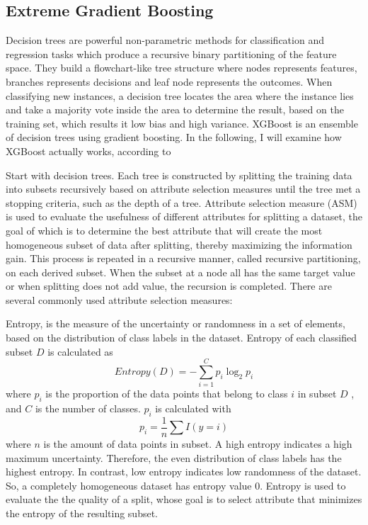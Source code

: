 \documentclass[12pt,a4paper,english
]{tunithesis}
\begin{document}
\subsection{Extreme Gradient Boosting}
Decision trees are powerful non-parametric methods for classification and regression tasks which produce a recursive binary partitioning of the feature space. They build a flowchart-like tree structure where nodes represents features, branches represents decisions and leaf node represents the outcomes. When classifying new instances, a decision tree locates the area where the instance lies and take a majority vote inside the area to determine the result, based on the training set, which results it low bias and high variance. XGBoost is an ensemble of decision trees using gradient boosting. In the following, I will examine how XGBoost actually works, according to \textcite{song2015, chen2016, mitchell2017, hastie2009, stanford_ml, geek_xgboost}

Start with decision trees. Each tree is constructed by splitting the training data into subsets recursively based on attribute selection measures until the tree met a stopping criteria, such as the depth of a tree. Attribute selection measure (ASM) is used to evaluate the usefulness of different attributes for splitting a dataset, the goal of which is to determine the best attribute that will create the most homogeneous subset of data after splitting, thereby maximizing the information gain. This process is repeated in a recursive manner, called recursive partitioning, on each derived subset. When the subset at a node all has the same target value or when splitting does not add value, the recursion is completed. There are several commonly used attribute selection measures:

Entropy, is the measure of the uncertainty or randomness in a set of elements, based on the distribution of class labels in the dataset. Entropy of each classified subset ${D}$ is calculated as
\begin{equation}
    Entropy(D)=-\sum_{i = 1}^C {p_i} \log _2 {p_i}
\end{equation}
where ${p_i}$ is the proportion of the data points that belong to class ${i}$ in subset ${D}$ , and ${C}$ is the number of classes. ${p_i}$ is calculated with
\begin{equation}
    p_i = \frac{1}{n} \sum I(y=i)
\end{equation}
where ${n}$ is the amount of data points in subset.
A high entropy indicates a high maximum uncertainty. Therefore, the even distribution of class labels has the highest entropy. In contrast, low entropy indicates low randomness of the dataset. So, a completely homogeneous dataset has entropy value 0. Entropy is used to evaluate the the quality of a split, whose goal is to select attribute that minimizes the entropy of the resulting subset.
\end{document}
